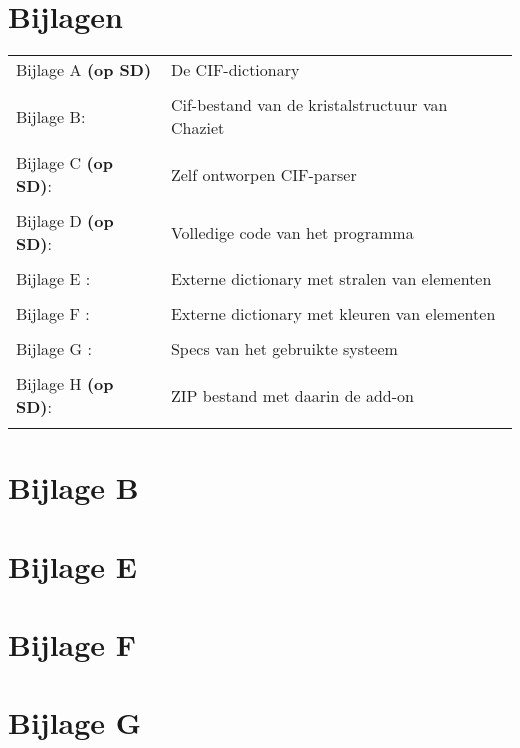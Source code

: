 \chapter*{Bijlagen}

\begin{tabular}{ll}

  

Bijlage A \textbf{(op SD)}  &	De CIF-dictionary 
\\ \\
Bijlage B: &	Cif-bestand van de kristalstructuur van Chaziet  
\\ \\
Bijlage C \textbf{(op SD)}: &	Zelf ontworpen CIF-parser
\\ \\
Bijlage D \textbf{(op SD)}: &	Volledige code van het programma 
\\ \\
Bijlage E : & Externe dictionary met stralen van elementen
\\ \\
Bijlage F : & Externe dictionary met kleuren van elementen
\\ \\
Bijlage G : & Specs van het gebruikte systeem
\\ \\
Bijlage H \textbf{(op SD)}:& ZIP bestand met daarin de add-on
\\ \\
\end{tabular}
\newpage

\chapter*{Bijlage B}


\chapter*{Bijlage E}


\chapter*{Bijlage F}


\chapter*{Bijlage G}

